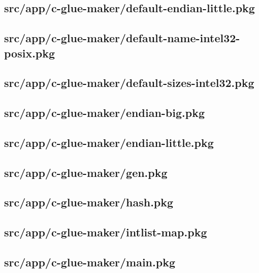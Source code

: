 \subsection{src/app/c-glue-maker/default-endian-little.pkg}


\subsection{src/app/c-glue-maker/default-name-intel32-posix.pkg}


\subsection{src/app/c-glue-maker/default-sizes-intel32.pkg}


\subsection{src/app/c-glue-maker/endian-big.pkg}


\subsection{src/app/c-glue-maker/endian-little.pkg}


\subsection{src/app/c-glue-maker/gen.pkg}


\subsection{src/app/c-glue-maker/hash.pkg}


\subsection{src/app/c-glue-maker/intlist-map.pkg}


\subsection{src/app/c-glue-maker/main.pkg}


